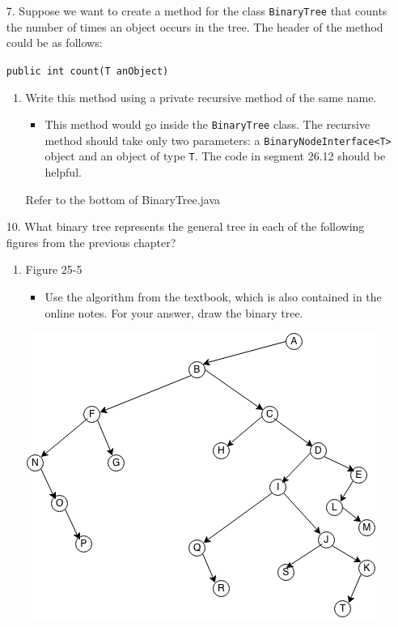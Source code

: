 \documentclass[10pt]{article}
\begin{document}
\begin{enumerate}
	\item[7.] Suppose we want to create a method for the class \texttt{BinaryTree} that counts the number of times an object occurs in the tree. The header of the method could be as follows:
		
		\vspace{0.1cm}
		\texttt{public int count(T anObject)}
		\begin{enumerate}
			\item Write this method using a private recursive method of the same name.
				\begin{itemize}
					\item This method would go inside the \texttt{BinaryTree} class. The recursive method should take only two parameters: a \texttt{BinaryNodeInterface<T>} object and an object of type \texttt{T}. The code in segment 26.12 should be helpful.
				\end{itemize}
				
				\vspace{0.5cm}
				Refer to the bottom of BinaryTree.java
				\vspace{0.5cm}
		\end{enumerate}
	
	\item[10.] What binary tree represents the general tree in each of the following figures from the previous chapter?
		\begin{enumerate}
			\item Figure 25-5
				\begin{itemize}
					\item Use the algorithm from the textbook, which is also contained in the online notes. For your answer, draw the binary tree.
				\end{itemize}
				
				\vspace{0.5cm}
				\includegraphics[scale=0.5]{images/26_10.png}
				\vspace{0.5cm}
		\end{enumerate}
	

\end{enumerate}
\end{document}
